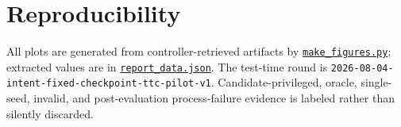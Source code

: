 \documentclass[10pt]{article}
\begin{document}
\section{Reproducibility}
All plots are generated from controller-retrieved artifacts by \href{run:make_figures.py}{\texttt{make\_figures.py}}; extracted values are in \href{run:report_data.json}{\texttt{report\_data.json}}. The test-time round is \texttt{2026-08-04-intent-fixed-checkpoint-ttc-pilot-v1}. Candidate-privileged, oracle, single-seed, invalid, and post-evaluation process-failure evidence is labeled rather than silently discarded.
\end{document}
